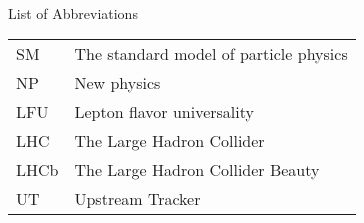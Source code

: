 \singlespacing \normalsize
\hbox{\ }

\vspace{.5in}

\begin{center}
\large{List of Abbreviations}
\end{center}

\vspace{3pt}

\begin{supertabular}{ll}
    SM    & The standard model of particle physics \\
    NP    & New physics \\
    LFU   & Lepton flavor universality \\
    LHC   & The Large Hadron Collider \\
    LHCb  & The Large Hadron Collider Beauty \\
    UT    & Upstream Tracker \\
\end{supertabular}

